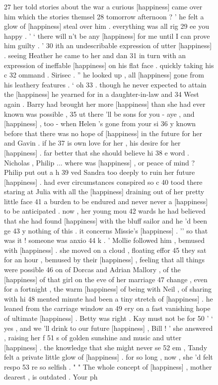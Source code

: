 \begin{figure}
\begin{fitverb}
27 her told stories about the war a curious [happiness] came over him which the stories themsel
28 tomorrow afternoon ? ' he felt a glow of [happiness] steal over him . everything was all rig
29 ee you happy . ' ` there will n't be any [happiness] for me until I can prove him guilty . '
30 ith an undescribable expression of utter [happiness] . seeing Heather he came to her and dan
31  in turn with an expression of ineffable [happiness] on his flat face . quickly taking his c
32 ommand . Sirisec . '' he looked up , all [happiness] gone from his leathery features . ` oh
33 . though he never expected to attain the [happiness] he yearned for in a daughter-in-law and
34  West again . Barry had brought her more [happiness] than she had ever known was possible ,
35 ut there 'll be sons for you - aye , and [happiness] , too - when Helen 's gone from your si
36 y known before that there was no hope of [happiness] in the future for her and Gavin . if he
37 is own love for her , his desire for her [happiness] . far better that she should believe hi
38 e word . Nicholas , Philip ... where was [happiness] , or peace of mind ? Philip put out a h
39 ved Sandra too deeply to ruin her future [happiness] . had ever circumstances conspired so c
40 tood there staring at Julia with all the [happiness] draining out of her pretty little face
41 a burden to be endured and never never a [happiness] to be anticipated . now , her young mou
42 wards he had believed that she had found [happiness] with the bluff sailor and he 'd been ge
43 y nothing of this . it concerns Missie's [happiness] . '' so that was it ! someone was anxio
44 k . ' Mollie followed him , bemused with [happiness] . she moved on a cloud , floating effor
45  they sat for an hour , bemused by their [happiness] , feeling that all things were possible
46 on of Dorcas and Adrian Mallory , of the [happiness] of that girl on the eve of her marriage
47 change , even for a fortnight , the warm [happiness] of being with Neil , of sharing with hi
48 mented minute had been a tiny stretch of [happiness] . he leaned from the carriage window an
49 ery on a fast vanishing hope of ultimate [happiness] . Betty was right . Kay must not be for
50 ' ` yes , and we 'll drink to our future [happiness] , Bill ! ' she answered , raising her f
51 s of golden sunshine and music and utter [happiness] . the knowledge that she might never se
52 em , Tandy felt a private little glow of [happiness] . for so long , now , she 'd felt respo
53 re so selfish . " " The whole concept of [happiness] , mother dearest , is outdated . Your ph
\end{fitverb}
\hrulefill
\end{figure}

